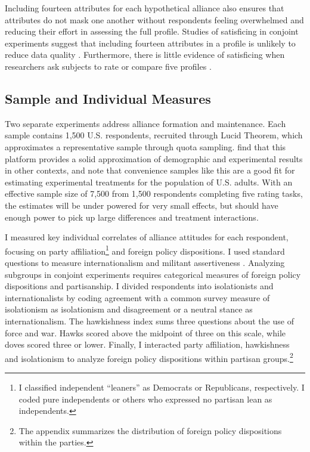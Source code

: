 \documentclass[12pt]{article}
\begin{document}
Including fourteen attributes for each hypothetical alliance also ensures that attributes do not mask one another without respondents feeling overwhelmed and reducing their effort in assessing the full profile.
Studies of satisficing in conjoint experiments suggest that including fourteen attributes in a profile is unlikely to reduce data quality \citep{Bansaketal2019}. 
Furthermore, there is little evidence of satisficing when researchers ask subjects to rate or compare five profiles \citep{Bansaketal2018}.



\subsection{Sample and Individual Measures}


Two separate experiments address alliance formation and maintenance. 
Each sample contains 1,500 U.S. respondents, recruited through Lucid Theorem, which approximates a representative sample through quota sampling.
\citet{CoppockMcClellan2019} find that this platform provides a solid approximation of demographic and experimental results in other contexts, and note that convenience samples like this are a good fit for estimating experimental treatments for the population of U.S. adults.
With an effective sample size of 7,500 from 1,500 respondents completing five rating tasks, the estimates will be under powered for very small effects, but should have enough power to pick up large differences and treatment interactions. 


I measured key individual correlates of alliance attitudes for each respondent, focusing on party affiliation\footnote{I classified independent ``leaners'' as Democrats or Republicans, respectively. I coded pure independents or others who expressed no partisan lean as independents.} and foreign policy dispositions. 
I used standard questions to measure internationalism and militant assertiveness \citep{KertzerBrutger2016}.
Analyzing subgroups in conjoint experiments requires categorical measures of foreign policy dispositions and partisanship.
I divided respondents into isolationists and internationalists by coding agreement with a common survey measure of isolationism as isolationism and disagreement or a neutral stance as internationalism. 
The hawkishness index sums three questions about the use of force and war. 
Hawks scored above the midpoint of three on this scale, while doves scored three or lower. 
Finally, I interacted party affiliation, hawkishness and isolationism to analyze foreign policy dispositions within partisan groups.\footnote{The appendix summarizes the distribution of foreign policy dispositions within the parties.} 
\end{document}
